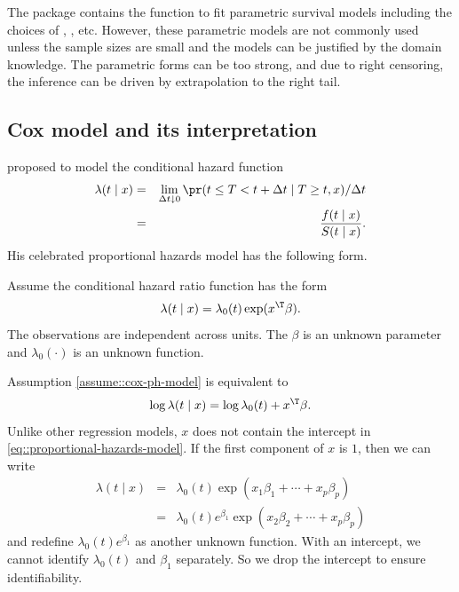  
The  package  contains the function  to fit parametric survival models including the choices of , , etc. However, these parametric models are not commonly used unless the sample sizes are small and the models can be justified by the domain knowledge. The parametric forms can be too strong, and due to right censoring, the inference can be driven by extrapolation to the right tail. 


\subsection{Cox model and its interpretation}

 

\citet{cox1972regression} proposed to model the conditional hazard function
\begin{eqnarray*}
\lambda(t\mid x) 
&=& \lim_{\Delta t\downarrow0}\pr(t\leq T<t+\Delta t\mid T\geq t,x)/\Delta t \\
&=&\frac{f(t\mid x)}{S(t\mid x)} .
\end{eqnarray*}
His celebrated proportional hazards model has the following form.

\begin{assumption}
\label{assume::cox-ph-model}
Assume the conditional hazard ratio function has the form
\begin{eqnarray}\label{eq::proportional-hazards-model}
\lambda(t\mid x)=\lambda_{0}(t)\exp(x^{\T}\beta) .
\end{eqnarray}
The observations are independent across units. The $\beta$ is an unknown parameter and $\lambda_{0}(\cdot)$ is an unknown function. 
\end{assumption}

Assumption \ref{assume::cox-ph-model} is equivalent to
$$
\log \lambda(t\mid x) = \log \lambda_{0}(t) + x^{\T}\beta .
$$
Unlike other regression models, $x$ does not contain the intercept in \eqref{eq::proportional-hazards-model}. If the first component of $x$ is $1$, then we can write 
\begin{eqnarray*}
\lambda(t\mid x) 
&=&\lambda_{0}(t)  \exp(x_1\beta_1 + \cdots + x_p \beta_p) \\
&=& \lambda_{0}(t) e^{\beta_1}  \exp(x_2\beta_2 + \cdots + x_p \beta_p)
\end{eqnarray*}
and redefine $\lambda_{0}(t) e^{\beta_1}$ as another unknown function. With an intercept, we cannot identify $\lambda_{0}(t) $ and $\beta_1$ separately.  So we drop the intercept to ensure identifiability. 

